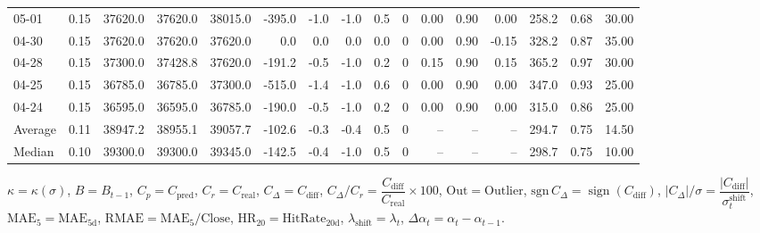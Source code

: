 \begin{threeparttable}
{\begin{tabular}{lrrrrrrrrrrrrrrr}
  05-01 &     0.15 & 37620.0 & 37620.0 & 38015.0 &     -395.0 &           -1.0 &                     -1.0 &                 0.5 &              0 &       0.00 &      0.90 &           0.00 &            258.2 &            0.68 &                  30.00 \\
  04-30 &     0.15 & 37620.0 & 37620.0 & 37620.0 &        0.0 &            0.0 &                      0.0 &                 0.0 &              0 &       0.00 &      0.90 &          -0.15 &            328.2 &            0.87 &                  35.00 \\
  04-28 &     0.15 & 37300.0 & 37428.8 & 37620.0 &     -191.2 &           -0.5 &                     -1.0 &                 0.2 &              0 &       0.15 &      0.90 &           0.15 &            365.2 &            0.97 &                  30.00 \\
  04-25 &     0.15 & 36785.0 & 36785.0 & 37300.0 &     -515.0 &           -1.4 &                     -1.0 &                 0.6 &              0 &       0.00 &      0.90 &           0.00 &            347.0 &            0.93 &                  25.00 \\
  04-24 &     0.15 & 36595.0 & 36595.0 & 36785.0 &     -190.0 &           -0.5 &                     -1.0 &                 0.2 &              0 &       0.00 &      0.90 &           0.00 &            315.0 &            0.86 &                  25.00 \\
Average &     0.11 & 38947.2 & 38955.1 & 39057.7 &     -102.6 &           -0.3 &                     -0.4 &                 0.5 &              0 &         -- &        -- &             -- &            294.7 &            0.75 &                  14.50 \\
 Median &     0.10 & 39300.0 & 39300.0 & 39345.0 &     -142.5 &           -0.4 &                     -1.0 &                 0.5 &              0 &         -- &        -- &             -- &            298.7 &            0.75 &                  10.00 \\
\bottomrule
\end{tabular}
}
\begin{tablenotes}\footnotesize
\item $\kappa=\kappa(\sigma)$, $B=B_{t-1}$, $C_p=C_{\text{pred}}$, $C_r=C_{\text{real}}$, $C_\Delta=C_{\text{diff}}$, $C_\Delta/C_r=\dfrac{C_{\text{diff}}}{C_{\text{real}}}\times100$, $\mathrm{Out}=\text{Outlier}$, $\mathrm{sgn}\,C_\Delta=\operatorname{sign}(C_{\text{diff}})$, $|C_\Delta|/\sigma=\dfrac{|C_{\text{diff}}|}{\sigma_t^{\text{shift}}}$, $\mathrm{MAE}_5=\mathrm{MAE}_{5\text{d}}$, $\mathrm{RMAE}= \mathrm{MAE}_5 / \text{Close}$, $\mathrm{HR}_{20}=\mathrm{HitRate}_{20\text{d}}$, 
$\lambda_{\text{shift}}=\lambda_t$, 
$\Delta\alpha_t=\alpha_t-\alpha_{t-1}$.
\end{tablenotes}
\end{threeparttable}
\endgroup

